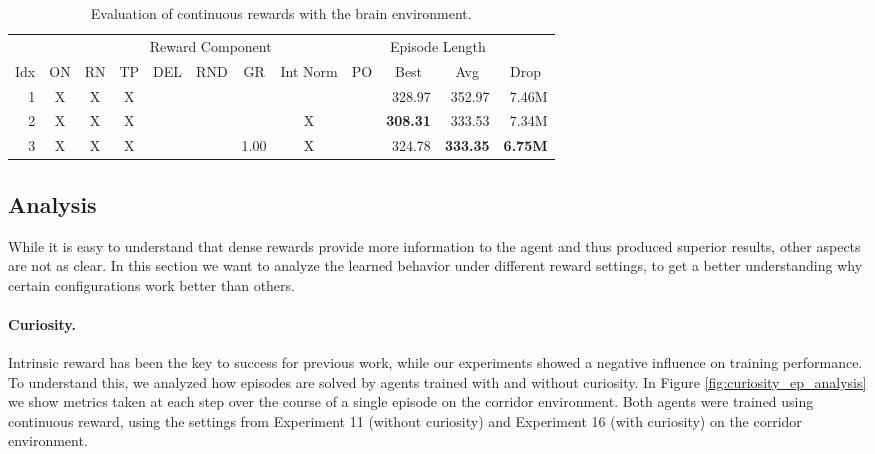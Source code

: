 \begin{table}[htp]
    \begin{center}
        \begin{tabular}{rccccccccrrr}
            \toprule
             & \multicolumn{8}{c}{Reward Component} & \multicolumn{2}{c}{Episode Length} & \\
            \cmidrule(lr){2-9}\cmidrule(lr){10-11}
            \multicolumn{1}{c}{Idx} & \multicolumn{1}{c}{ON} & \multicolumn{1}{c}{RN} & \multicolumn{1}{c}{TP} & \multicolumn{1}{c}{DEL} & \multicolumn{1}{c}{RND} & \multicolumn{1}{c}{GR} & \multicolumn{1}{c}{Int Norm} & \multicolumn{1}{c}{PO} & \multicolumn{1}{c}{Best} & \multicolumn{1}{c}{Avg} & \multicolumn{1}{c}{Drop}\\
            \midrule
            1 & X & X & X &  &  &  &  &  & 328.97 & 352.97 & 7.46M \\
            2 & X & X & X &  &  &  & X &  & \textbf{308.31} & 333.53 & 7.34M \\
            3 & X & X & X &  &  & 1.00 & X &  & 324.78 & \textbf{333.35} & \textbf{6.75M} \\
            \bottomrule
        \end{tabular}
    \end{center}
    \caption[Evaluation of Continuous Reward with the Brain Environment]{Evaluation of continuous rewards with the brain environment.} \label{tab:Maze0122/Reward/Continuous}
\end{table}


\subsection{Analysis} \label{sec:RewardAnalysis}
While it is easy to understand that dense rewards provide more information to the agent and thus produced superior results, other aspects are not as clear. In this section we want to analyze the learned behavior under different reward settings, to get a better understanding why certain configurations work better than others.

\paragraph{Curiosity.} Intrinsic reward has been the key to success for previous work, while our experiments showed a negative influence on training performance. To understand this, we analyzed how episodes are solved by agents trained with and without curiosity. In Figure \ref{fig:curiosity_ep_analysis} we show metrics taken at each step over the course of a single episode on the corridor environment. Both agents were trained using continuous reward, using the settings from Experiment 11 (without curiosity) and Experiment 16 (with curiosity) on the corridor environment. 

